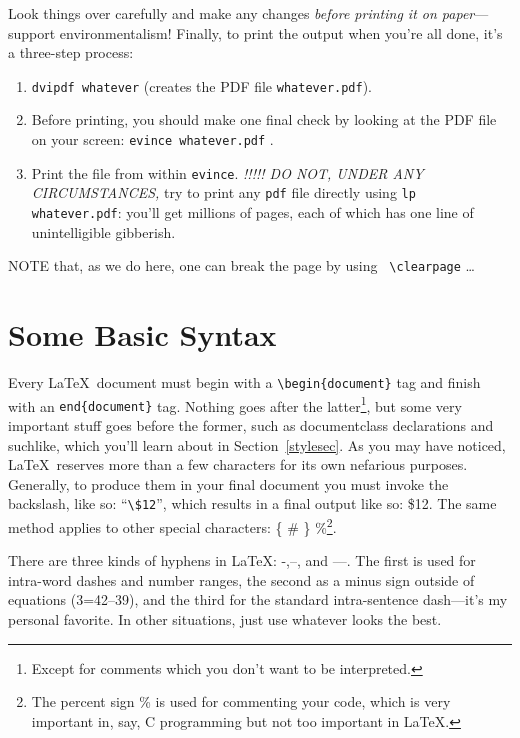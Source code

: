 \documentclass[12pt,preprint]{aastex}
\begin{document}
Look things over carefully and make any changes {\it before printing it
on paper}---support environmentalism!  Finally, to print the output when
you're all done, it's a three-step process:
\begin{enumerate}

\item \verb$dvipdf whatever$ (creates the PDF file {\tt whatever.pdf}).

\item Before printing, you should make one final check by looking
at the PDF file on your screen: {\tt evince whatever.pdf} .

\item Print the file from within {\tt evince}. {\it !!!!! DO NOT, UNDER
  ANY CIRCUMSTANCES,} try to print any {\tt pdf} file directly using
  {\tt lp whatever.pdf}: you'll get millions of pages, each of which has
  one line of unintelligible gibberish.
\end{enumerate}

NOTE that, as we do here, one can break the page by using {\tt
  \verb&\&clearpage} \dots
\clearpage

\section{Some Basic Syntax}\label{basicsec}

Every \LaTeX\ document must begin with a \verb&\begin{document}& tag and
finish with an {\tt end\{document\}} tag.  Nothing goes after the
latter\footnote{Except for comments which you don't want to be
  interpreted.}, but some very important stuff goes before the former,
such as documentclass declarations and suchlike, which you'll learn
about in Section~\ref{stylesec}.
As you may have noticed, \LaTeX\ reserves more than a few characters for
its own nefarious purposes.  Generally, to produce them in your final
document you must invoke the backslash, like so: ``\verb&\$12&'', which
results in a final output like so: \$12.  The same method applies to other
special characters: \{ \# \} \%\footnote{The percent sign \% is used for
commenting your code, which is very important in, say, C programming but
not too important in \LaTeX.}.  

There are three kinds of hyphens in \LaTeX: -,--, and ---.  The first is
used for intra-word dashes and number ranges, the second as a minus sign
outside of equations (3=42--39), and the third for the standard
intra-sentence dash---it's my personal favorite.  In other situations,
just use whatever looks the best.
\end{document}
